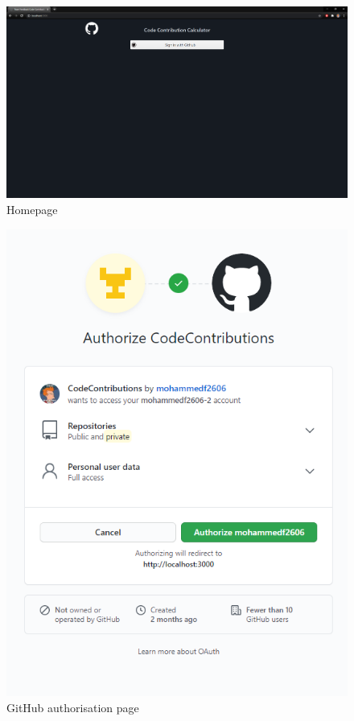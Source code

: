 \begin{figure}
    \centering
    \includegraphics[scale=0.3]{Appendices/Screenshot_92.png}
    \caption{Homepage}
    \label{fig:sc1}
\end{figure}
\begin{figure}
    \centering
    \includegraphics[scale=0.6]{Appendices/Screenshot_98.png}
    \caption{GitHub authorisation page}
    \label{fig:sc7}
\end{figure}

